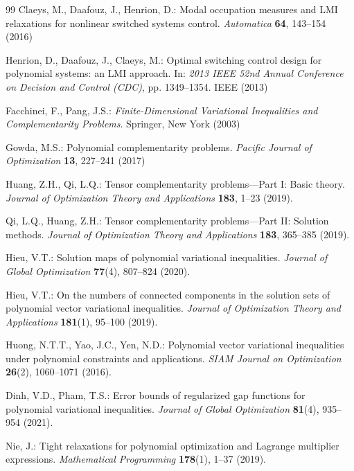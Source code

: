 \documentclass[sn-basic,Numbered]{sn-jnl}
\theoremstyle{thmstyleone}%
\begin{document}
\begin{thebibliography}{99}
Claeys, M., Daafouz, J., Henrion, D.: Modal occupation measures and {LMI} relaxations for nonlinear switched systems control. \emph{Automatica} \textbf{64}, 143--154 (2016)

Henrion, D., Daafouz, J., Claeys, M.: Optimal switching control design for polynomial systems: an {LMI} approach. In: \emph{2013 IEEE 52nd Annual Conference on Decision and Control (CDC)}, pp. 1349--1354. IEEE (2013)

Facchinei, F., Pang, J.S.: \emph{Finite-Dimensional Variational Inequalities and Complementarity Problems}. Springer, New York (2003)

Gowda, M.S.: Polynomial complementarity problems. \emph{Pacific Journal of Optimization} \textbf{13}, 227--241 (2017)

Huang, Z.H., Qi, L.Q.: Tensor complementarity problems---Part I: Basic theory. \emph{Journal of Optimization Theory and Applications} \textbf{183}, 1--23 (2019). 

Qi, L.Q., Huang, Z.H.: Tensor complementarity problems---Part II: Solution methods. \emph{Journal of Optimization Theory and Applications} \textbf{183}, 365--385 (2019). 

Hieu, V.T.: Solution maps of polynomial variational inequalities. \emph{Journal of Global Optimization} \textbf{77}(4), 807--824 (2020). 

Hieu, V.T.: On the numbers of connected components in the solution sets of polynomial vector variational inequalities. \emph{Journal of Optimization Theory and Applications} \textbf{181}(1), 95--100 (2019). 

Huong, N.T.T., Yao, J.C., Yen, N.D.: Polynomial vector variational inequalities under polynomial constraints and applications. \emph{SIAM Journal on Optimization} \textbf{26}(2), 1060--1071 (2016). 

Dinh, V.D., Pham, T.S.: Error bounds of regularized gap functions for polynomial variational inequalities. \emph{Journal of Global Optimization} \textbf{81}(4), 935--954 (2021). 

Nie, J.: Tight relaxations for polynomial optimization and Lagrange multiplier expressions. \emph{Mathematical Programming} \textbf{178}(1), 1--37 (2019). 



\end{thebibliography}
\end{document}

